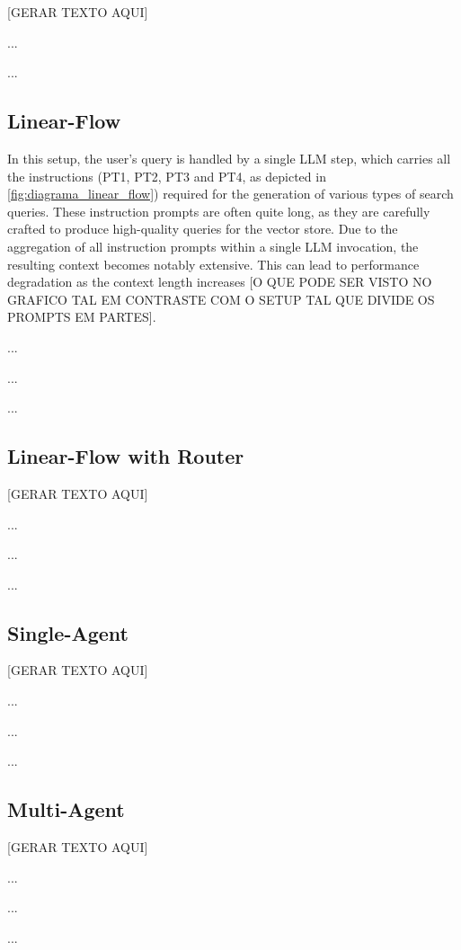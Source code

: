                 [GERAR TEXTO AQUI]

                ...

                ...
            

        \subsection{Linear-Flow}


            In this setup, the user’s query is handled by a single LLM step, which carries all the instructions (PT1, PT2, PT3 and PT4, as depicted in \ref{fig:diagrama_linear_flow}) required for the generation of various types of search queries. These instruction prompts are often quite long, as they are carefully crafted to produce high-quality queries for the vector store. Due to the aggregation of all instruction prompts within a single LLM invocation, the resulting context becomes notably extensive. This can lead to performance degradation as the context length increases [O QUE PODE SER VISTO NO GRAFICO TAL EM CONTRASTE COM O SETUP TAL QUE DIVIDE OS PROMPTS EM PARTES]. 
            
            ...

            ...
            
            ...

        \subsection{Linear-Flow with Router}

            [GERAR TEXTO AQUI]

            ...

            ...
            
            ...

        \subsection{Single-Agent}

            [GERAR TEXTO AQUI]

            ...

            ...
            
            ...
        
        \subsection{Multi-Agent}

            [GERAR TEXTO AQUI]

            ...
            
            ...
            
            ...
